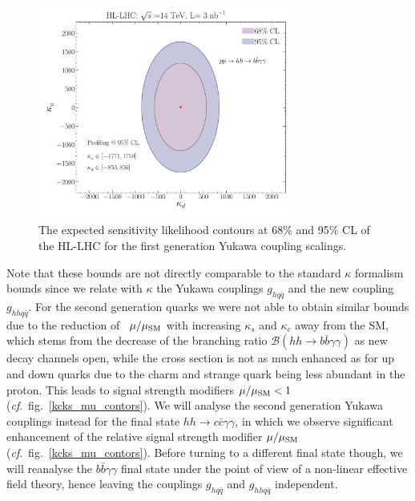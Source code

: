\begin{figure}[!b]
	\centering
	\includegraphics[width = 0.75\textwidth]{./fig/1st_gen_exclusion}
	\caption{The expected sensitivity likelihood contours  at  68\% and 95\% CL of the HL-LHC for the first generation Yukawa coupling scalings. }
	\label{bounds_1stgen}
\end{figure}
%
\par
Note that these bounds are not directly comparable to the standard $\kappa$ formalism bounds since we relate with $\kappa$ the Yukawa couplings $g_{hq\bar{q}}$ and the new coupling  $g_{hhq\bar{q}}$.
For the second generation quarks we were not able to obtain similar bounds due to the reduction of ~$\mu /\mu_{\mathrm{SM}}$ with increasing $ \kappa_s$ and $\kappa_c$ away from the SM, which stems from the decrease of the branching ratio $\mathcal B (hh \to b \bar b \gamma \gamma)$ as new decay channels open, while the cross section is not as much enhanced as for up and down quarks due to the charm and strange quark being less abundant in the proton. This leads to signal strength modifiers $\mu/\mu_{\mathrm{SM}}< 1$ (\textit{cf}.~fig.~\ref{kcks_mu_contors}).  We will analyse the second generation Yukawa couplings instead for the final state $hh \to c \bar c \gamma \gamma$, in which we observe significant enhancement of the relative signal strength modifier $\mu/\mu_{\mathrm{SM}}$ (\textit{cf}.~fig.~\ref{kcks_mu_contors}). Before turning to a different final state though, we will reanalyse the $b\bar{b}\gamma\gamma$ final state under the point of view of a non-linear effective field theory, hence leaving the couplings $g_{hq\bar{q}}$ and $g_{hhq\bar{q}}$ independent.
